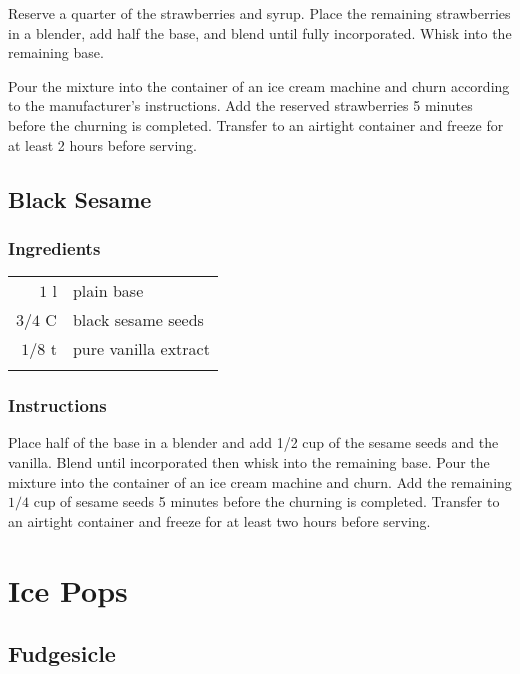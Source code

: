 \documentclass[12pt,landscape,twoside,twocolumn, openright, titlepage, draft]{book}
\begin{document}
Reserve a quarter of the strawberries and syrup. Place the remaining strawberries in a blender, add half the base, and blend until fully incorporated. Whisk into the remaining base.

Pour the mixture into the container of an ice cream machine and churn according to the manufacturer's instructions. Add the reserved strawberries 5 minutes before the churning is completed. Transfer to an airtight container and freeze for at least 2 hours before serving.

\subsection{Black Sesame}
\subsubsection{Ingredients}
\begin{tabular}{r p{1.5in}}
$1$   l & plain base            \\ 
$3/4$ C & black sesame seeds    \\ 
$1/8$ t & pure vanilla extract  \\ \\
\end{tabular}
\subsubsection{Instructions}
Place half of the base in a blender and add 1/2 cup of the sesame seeds and the vanilla. Blend until incorporated then whisk into the remaining base. Pour the mixture into the container of an ice cream machine and churn. Add the remaining $1/4$ cup of sesame seeds 5 minutes before the churning is completed. Transfer to an airtight container and freeze for at least two hours before serving.

\section{Ice Pops}
\subsection{Fudgesicle}
\end{document}
